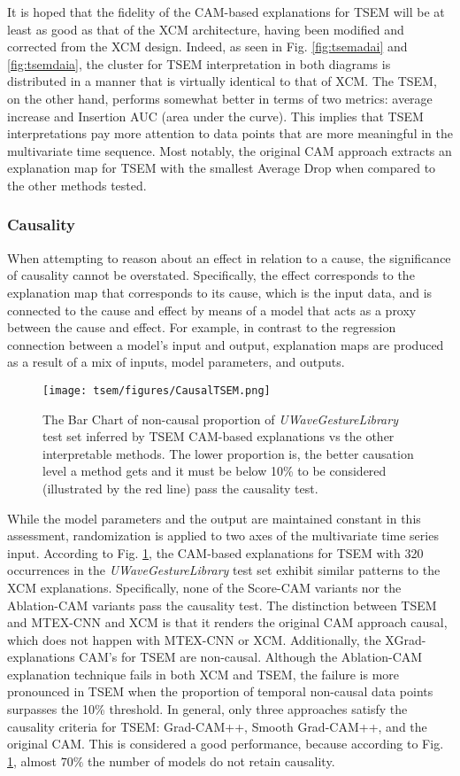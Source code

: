 \documentclass{svproc}
\begin{document}
It is hoped that the fidelity of the CAM-based explanations for TSEM will be at least as good as that of the XCM architecture, having been modified and corrected from the XCM design. Indeed, as seen in Fig. \ref{fig:tsemadai} and \ref{fig:tsemdaia}, the cluster for TSEM interpretation in both diagrams is distributed in a manner that is virtually identical to that of XCM. The TSEM, on the other hand, performs somewhat better in terms of two metrics: average increase and Insertion AUC (area under the curve). This implies that TSEM interpretations pay more attention to data points that are more meaningful in the multivariate time sequence. Most notably, the original CAM approach extracts an explanation map for TSEM with the smallest Average Drop when compared to the other methods tested.

\subsubsection{Causality}

When attempting to reason about an effect in relation to a cause, the significance of causality cannot be overstated. Specifically, the effect corresponds to the explanation map that corresponds to its cause, which is the input data, and is connected to the cause and effect by means of a model that acts as a proxy between the cause and effect. For example, in contrast to the regression connection between a model's input and output, explanation maps are produced as a result of a mix of inputs, model parameters, and outputs.
\begin{figure}[h!]
\centering
\texttt{[image: tsem/figures/CausalTSEM.png]}
\caption{The Bar Chart of non-causal proportion of \textit{UWaveGestureLibrary} test set inferred by TSEM CAM-based explanations vs the other interpretable methods. The lower proportion is, the better causation level a method gets and it must be below 10\% to be considered (illustrated by the red line) pass the causality test.}
\label{fig:causality}
\end{figure}

While the model parameters and the output are maintained constant in this assessment, randomization is applied to two axes of the multivariate time series input. According to Fig. \ref{fig:causality}, the CAM-based explanations for TSEM with 320 occurrences in the \textit{UWaveGestureLibrary} test set exhibit similar patterns to the XCM explanations. Specifically, none of the Score-CAM variants nor the Ablation-CAM variants pass the causality test. The distinction between TSEM and MTEX-CNN and XCM is that it renders the original CAM approach causal, which does not happen with MTEX-CNN or XCM. Additionally, the XGrad-explanations CAM's for TSEM are non-causal. Although the Ablation-CAM explanation technique fails in both XCM and TSEM, the failure is more pronounced in TSEM when the proportion of temporal non-causal data points surpasses the 10\% threshold. In general, only three approaches satisfy the causality criteria for TSEM: Grad-CAM++, Smooth Grad-CAM++, and the original CAM. This is considered a good performance, because according to Fig. \ref{fig:causality}, almost $70\%$ the number of models do not retain causality. 
\end{document}
